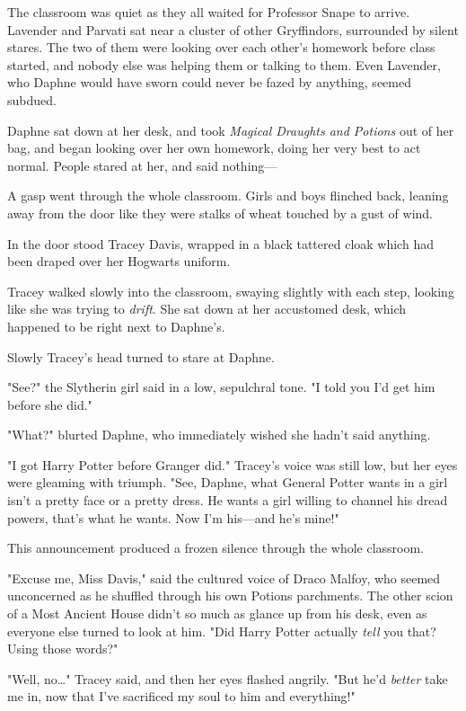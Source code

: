 The classroom was quiet as they all waited for Professor Snape to arrive. 
Lavender and Parvati sat near a cluster of other Gryffindors, surrounded by 
silent stares. The two of them were looking over each other's homework before 
class started, and nobody else was helping them or talking to them. Even 
Lavender, who Daphne would have sworn could never be fazed by anything, seemed 
subdued.

Daphne sat down at her desk, and took \emph{Magical Draughts and Potions} out 
of her bag, and began looking over her own homework, doing her very best to act 
normal. People stared at her, and said nothing---

A gasp went through the whole classroom. Girls and boys flinched back, leaning 
away from the door like they were stalks of wheat touched by a gust of wind.

In the door stood Tracey Davis, wrapped in a black tattered cloak which had 
been draped over her Hogwarts uniform.

Tracey walked slowly into the classroom, swaying slightly with each step, 
looking like she was trying to \emph{drift}. She sat down at her accustomed 
desk, which happened to be right next to Daphne's.

Slowly Tracey's head turned to stare at Daphne.

"See?" the Slytherin girl said in a low, sepulchral tone. "I told you I'd get 
him before she did."

"What?" blurted Daphne, who immediately wished she hadn't said anything.

"I got Harry Potter before Granger did." Tracey's voice was still low, but her 
eyes were gleaming with triumph. "See, Daphne, what General Potter wants in a 
girl isn't a pretty face or a pretty dress. He wants a girl willing to channel 
his dread powers, that's what he wants. Now I'm his---and he's mine!"

This announcement produced a frozen silence through the whole classroom.

"Excuse me, Miss Davis," said the cultured voice of Draco Malfoy, who seemed 
unconcerned as he shuffled through his own Potions parchments. The other scion 
of a Most Ancient House didn't so much as glance up from his desk, even as 
everyone else turned to look at him. "Did Harry Potter actually \emph{tell} you 
that? Using those words?"

"Well, no{\ldots}" Tracey said, and then her eyes flashed angrily. "But he'd 
\emph{better} take me in, now that I've sacrificed my soul to him and 
everything!"


